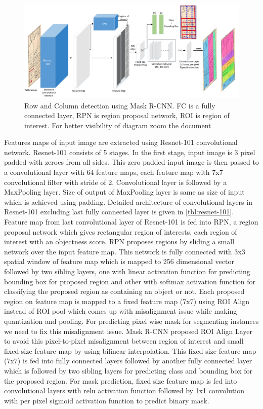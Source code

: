 \begin{figure}[h!]
\centering
\includegraphics[width=\linewidth, angle=0,keepaspectratio]{methodrow_col_mask_rcnn.pdf}
\caption{Row and Column detection using Mask R-CNN. FC is a fully connected layer, RPN is region proposal network, ROI is region of interest. For better visibility of diagram zoom the document}
\label{fig:maskRCNN_row_col}
\end{figure}
Features maps of input image are extracted using Resnet-101 convolutional network. Resnet-101 consists of 5 stages. In the first stage, input image is 3 pixel padded with zeroes from all sides. This zero padded input image is then passed to a convolutional layer with 64 feature maps, each feature map with 7x7 convolutional filter with stride of 2. Convolutional layer is followed by a MaxPooling layer. Size of output of MaxPooling layer is same as size of input which is achieved using padding. Detailed architecture of convolutional layers in Resnet-101 excluding last fully connected layer is given in \autoref{tbl:resnet-101}. Feature map from last convolutional layer of Resnet-101 is fed into RPN, a region proposal network which gives rectangular region of interests, each region of interest with an objectness score. RPN proposes regions by sliding a small network over the input feature map. This network is fully connected with 3x3 spatial window of feature map which is mapped to 256 dimensional vector followed by two sibling layers, one with linear activation function for predicting bounding box for proposed region and other with softmax activation function for classifying the proposed region as containing an object or not. Each proposed region on feature map is mapped to a fixed feature map (7x7) using ROI Align instead of ROI pool which comes up with misalignment issue while making quantization and pooling. For predicting pixel wise mask for segmenting instances we need to fix this misalignment issue. Mask R-CNN proposed ROI Align Layer to avoid this pixel-to-pixel misalignment between region of interest and small fixed size feature map by using bilinear interpolation. This fixed size feature map (7x7) is fed into fully connected layers followed by another fully connected layer which is followed by two sibling layers for predicting class and bounding box for the proposed region. For mask prediction, fixed size feature map is fed into convolutional layers with relu activation function followed by 1x1 convolution with per pixel sigmoid activation function to predict binary mask. 
